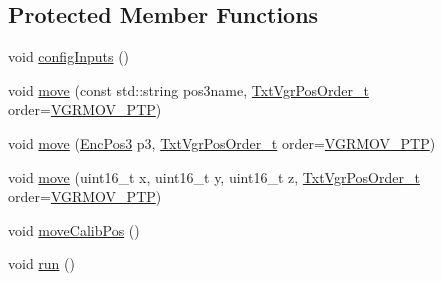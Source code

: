 \subsection*{Protected Member Functions}
\begin{DoxyCompactItemize}
\item 
void \hyperlink{classft_1_1_txt_vacuum_gripper_robot_a3a6f3a994787f7585fa4beb75420b75a}{config\+Inputs} ()
\item 
void \hyperlink{classft_1_1_txt_vacuum_gripper_robot_aa8842cda5ccb7bf866ab882b8e35bbb9}{move} (const std\+::string pos3name, \hyperlink{namespaceft_a467718790e157f00aca02ebada647f18}{Txt\+Vgr\+Pos\+Order\+\_\+t} order=\hyperlink{namespaceft_a467718790e157f00aca02ebada647f18a65d7c52d2590f4289203dad3994147fd}{V\+G\+R\+M\+O\+V\+\_\+\+P\+TP})
\item 
void \hyperlink{classft_1_1_txt_vacuum_gripper_robot_ae6ec4b662ea64e352ecade1200eb578d}{move} (\hyperlink{classft_1_1_enc_pos3}{Enc\+Pos3} p3, \hyperlink{namespaceft_a467718790e157f00aca02ebada647f18}{Txt\+Vgr\+Pos\+Order\+\_\+t} order=\hyperlink{namespaceft_a467718790e157f00aca02ebada647f18a65d7c52d2590f4289203dad3994147fd}{V\+G\+R\+M\+O\+V\+\_\+\+P\+TP})
\item 
void \hyperlink{classft_1_1_txt_vacuum_gripper_robot_a98e245d1dd1386564a775ca0a07fbe6d}{move} (uint16\+\_\+t x, uint16\+\_\+t y, uint16\+\_\+t z, \hyperlink{namespaceft_a467718790e157f00aca02ebada647f18}{Txt\+Vgr\+Pos\+Order\+\_\+t} order=\hyperlink{namespaceft_a467718790e157f00aca02ebada647f18a65d7c52d2590f4289203dad3994147fd}{V\+G\+R\+M\+O\+V\+\_\+\+P\+TP})
\item 
void \hyperlink{classft_1_1_txt_vacuum_gripper_robot_af13df23d8bb1e20214dc2bc6bc96249d}{move\+Calib\+Pos} ()
\item 
void \hyperlink{classft_1_1_txt_vacuum_gripper_robot_ade97c48921d05c3ba6ee5feb5268e457}{run} ()
\end{DoxyCompactItemize}
